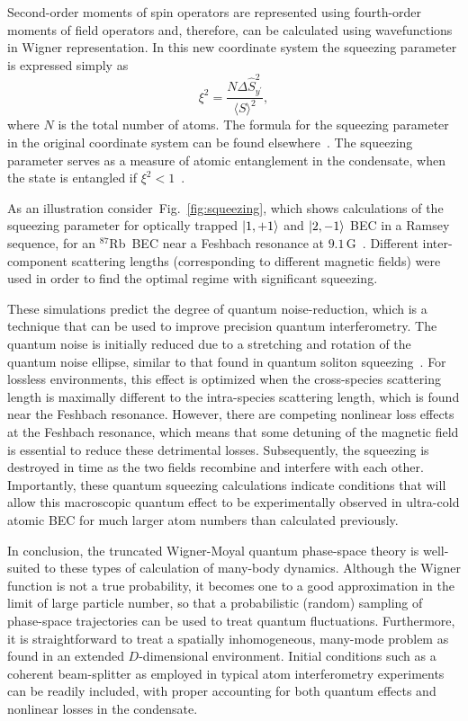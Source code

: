\documentclass[aps,prl,twocolumn,showpacs,amsmath,amssymb,superscriptaddress,flushbottom,noraggedfooter]{revtex4-1}
\newcommand{\Rb}{$^{87}$Rb}
\newcommand{\figref}[1]{Fig.~\ref{#1}}
\newcommand{\ket}[1]{\mbox{\ensuremath{\vert #1 \rangle}}}
\begin{document}
Second-order moments of spin operators are represented using fourth-order moments of field operators
and, therefore, can be calculated using wavefunctions in Wigner representation.
In this new coordinate system the squeezing parameter is expressed simply as
\begin{equation}
\label{eqn:squeezing}
	\xi^2 = \frac{N \Delta \hat{S}^2_{y^\prime}}{\langle S \rangle^2},
\end{equation}
where $N$ is the total number of atoms.
The formula for the squeezing parameter in the original coordinate system can be found elsewhere~\cite{Li2009}.
The squeezing parameter serves as a measure of atomic entanglement in the condensate,
when the state is entangled if $\xi^2 < 1$~\cite{Sorensen2001}.

As an illustration consider~\figref{fig:squeezing}, which shows calculations of the squeezing parameter
for optically trapped $\ket{1,+1}$ and $\ket{2,-1}$ BEC in a Ramsey sequence,
for an \Rb~BEC near a Feshbach resonance at $9.1\,\mathrm{G}$~\cite{Kaufman2009}.
Different inter-component scattering lengths (corresponding to different magnetic fields)
were used in order to find the optimal regime with significant squeezing.

These simulations predict the degree of quantum noise-reduction, which
is a technique that can be used to improve precision quantum interferometry.
The quantum noise is initially reduced due to a stretching and rotation
of the quantum noise ellipse, similar to that found in quantum soliton
squeezing~\cite{Carter1987,Drummond1993a}.
For lossless environments, this effect is optimized when the cross-species
scattering length is maximally different to the intra-species scattering
length, which is found near the Feshbach resonance.
However, there are competing nonlinear loss effects at the Feshbach resonance,
which means that some detuning of the magnetic field is essential to reduce
these detrimental losses.
Subsequently, the squeezing is destroyed in time as the two fields recombine
and interfere with each other.
Importantly, these quantum squeezing calculations indicate conditions that
will allow this macroscopic quantum effect to be experimentally
observed in ultra-cold atomic BEC for much larger atom
numbers than calculated previously.

In conclusion, the truncated Wigner-Moyal quantum phase-space theory is
well-suited to these types of calculation of many-body dynamics.
Although the Wigner function is not a true probability, it becomes one
to a good approximation in the limit of large particle number, so that
a probabilistic (random) sampling of phase-space trajectories can be used
to treat quantum fluctuations.
Furthermore, it is straightforward to treat a spatially inhomogeneous,
many-mode problem as found in an extended $D$-dimensional environment.
Initial conditions such as a coherent beam-splitter as employed in typical
atom interferometry experiments can be readily included,
with proper accounting for both quantum effects and nonlinear losses in the condensate.


\end{document}
